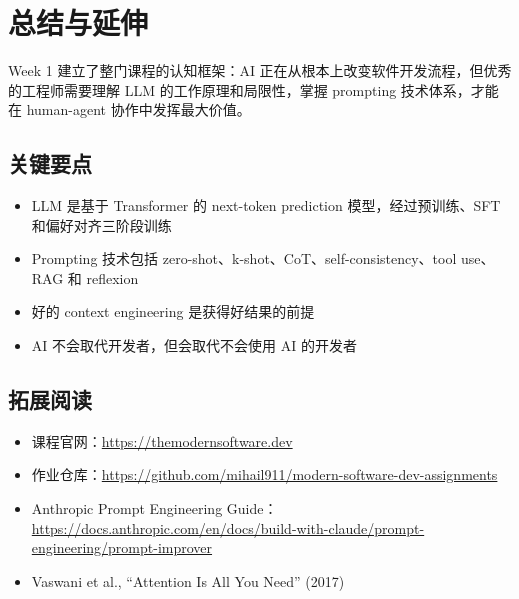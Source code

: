 \section{总结与延伸}

Week 1 建立了整门课程的认知框架：AI 正在从根本上改变软件开发流程，但优秀的工程师需要理解 LLM 的工作原理和局限性，掌握 prompting 技术体系，才能在 human-agent 协作中发挥最大价值。

\subsection{关键要点}

\begin{itemize}
    \item LLM 是基于 Transformer 的 next-token prediction 模型，经过预训练、SFT 和偏好对齐三阶段训练
    \item Prompting 技术包括 zero-shot、k-shot、CoT、self-consistency、tool use、RAG 和 reflexion
    \item 好的 context engineering 是获得好结果的前提
    \item AI 不会取代开发者，但会取代不会使用 AI 的开发者
\end{itemize}

\subsection{拓展阅读}

\begin{itemize}
    \item 课程官网：\url{https://themodernsoftware.dev}
    \item 作业仓库：\url{https://github.com/mihail911/modern-software-dev-assignments}
    \item Anthropic Prompt Engineering Guide：\url{https://docs.anthropic.com/en/docs/build-with-claude/prompt-engineering/prompt-improver}
    \item Vaswani et al., ``Attention Is All You Need'' (2017)
\end{itemize}



